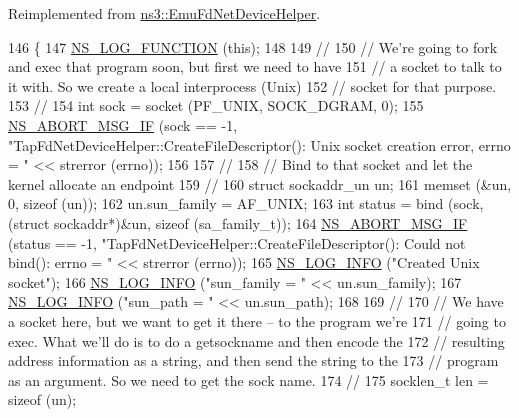 Reimplemented from \hyperlink{classns3_1_1EmuFdNetDeviceHelper_a64392b0acfeddf0121b251bc7e6e8906}{ns3\+::\+Emu\+Fd\+Net\+Device\+Helper}.


\begin{DoxyCode}
146 \{
147   \hyperlink{log-macros-disabled_8h_a90b90d5bad1f39cb1b64923ea94c0761}{NS\_LOG\_FUNCTION} (\textcolor{keyword}{this});
148 
149   \textcolor{comment}{//}
150   \textcolor{comment}{// We're going to fork and exec that program soon, but first we need to have}
151   \textcolor{comment}{// a socket to talk to it with.  So we create a local interprocess (Unix)}
152   \textcolor{comment}{// socket for that purpose.}
153   \textcolor{comment}{//}
154   \textcolor{keywordtype}{int} sock = socket (PF\_UNIX, SOCK\_DGRAM, 0);
155   \hyperlink{group__fatal_ga6653324225bc139e46deea177614ceee}{NS\_ABORT\_MSG\_IF} (sock == -1, \textcolor{stringliteral}{"TapFdNetDeviceHelper::CreateFileDescriptor(): Unix socket
       creation error, errno = "} << strerror (errno));
156 
157   \textcolor{comment}{//}
158   \textcolor{comment}{// Bind to that socket and let the kernel allocate an endpoint}
159   \textcolor{comment}{//}
160   \textcolor{keyword}{struct }sockaddr\_un un;
161   memset (&un, 0, \textcolor{keyword}{sizeof} (un));
162   un.sun\_family = AF\_UNIX;
163   \textcolor{keywordtype}{int} status = bind (sock, (\textcolor{keyword}{struct} sockaddr*)&un, \textcolor{keyword}{sizeof} (sa\_family\_t));
164   \hyperlink{group__fatal_ga6653324225bc139e46deea177614ceee}{NS\_ABORT\_MSG\_IF} (status == -1, \textcolor{stringliteral}{"TapFdNetDeviceHelper::CreateFileDescriptor(): Could not
       bind(): errno = "} << strerror (errno));
165   \hyperlink{group__logging_gafbd73ee2cf9f26b319f49086d8e860fb}{NS\_LOG\_INFO} (\textcolor{stringliteral}{"Created Unix socket"});
166   \hyperlink{group__logging_gafbd73ee2cf9f26b319f49086d8e860fb}{NS\_LOG\_INFO} (\textcolor{stringliteral}{"sun\_family = "} << un.sun\_family);
167   \hyperlink{group__logging_gafbd73ee2cf9f26b319f49086d8e860fb}{NS\_LOG\_INFO} (\textcolor{stringliteral}{"sun\_path = "} << un.sun\_path);
168 
169   \textcolor{comment}{//}
170   \textcolor{comment}{// We have a socket here, but we want to get it there -- to the program we're}
171   \textcolor{comment}{// going to exec.  What we'll do is to do a getsockname and then encode the}
172   \textcolor{comment}{// resulting address information as a string, and then send the string to the}
173   \textcolor{comment}{// program as an argument.  So we need to get the sock name.}
174   \textcolor{comment}{//}
175   socklen\_t len = \textcolor{keyword}{sizeof} (un);

\end{DoxyCode}
